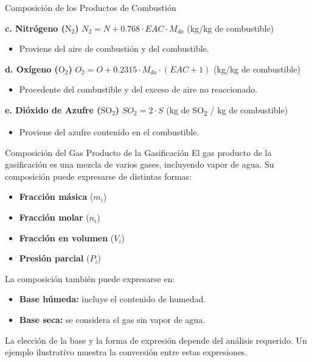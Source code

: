 \documentclass[../../main.tex]{subfiles}
\begin{document}
\begin{frame}{Composición de los Productos de Combustión}


\textbf{c. Nitrógeno (\( \text{N}_2 \))} \quad
\( N_2 = N + 0.768 \cdot EAC \cdot M_{da} \) \quad (kg/kg de combustible)

\begin{itemize}
  \item Proviene del aire de combustión y del combustible.
\end{itemize}

\vspace{-1ex}
\textbf{d. Oxígeno (\( \text{O}_2 \))} \quad
\( O_2 = O + 0.2315 \cdot M_{da} \cdot (EAC + 1) \) \quad (kg/kg de combustible)

\begin{itemize}
  \item Procedente del combustible y del exceso de aire no reaccionado.
\end{itemize}

\vspace{-1ex}
\textbf{e. Dióxido de Azufre (\( \text{SO}_2 \))} \quad
\( SO_2 = 2 \cdot S \) \quad (kg de SO\textsubscript{2} / kg de combustible)

\begin{itemize}
  \item Proviene del azufre contenido en el combustible.
\end{itemize}

\end{frame}

\begin{frame}{Composición del Gas Producto de la Gasificación}
\justifying
El gas producto de la gasificación es una mezcla de varios gases, incluyendo vapor de agua. Su composición puede expresarse de distintas formas:

\begin{itemize}
  \item \textbf{Fracción másica} (\( m_i \))
  \item \textbf{Fracción molar} (\( n_i \))
  \item \textbf{Fracción en volumen} (\( V_i \))
  \item \textbf{Presión parcial} (\( P_i \))
\end{itemize}

\vspace{0.5em}
La composición también puede expresarse en:
\begin{itemize}
  \item \textbf{Base húmeda:} incluye el contenido de humedad.
  \item \textbf{Base seca:} se considera el gas sin vapor de agua.
\end{itemize}

\vspace{0.5em}
La elección de la base y la forma de expresión depende del análisis requerido. Un ejemplo ilustrativo muestra la conversión entre estas expresiones.
\end{frame}
\end{document}
